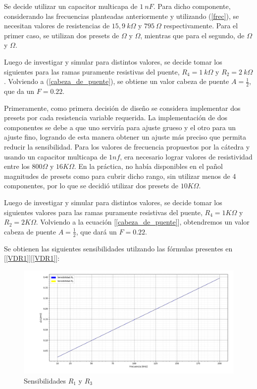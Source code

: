 Se decide utilizar un capacitor multicapa de $1 \ nF$. Para dicho componente, considerando las frecuencias planteadas anteriormente y utilizando (\ref{frec}), se necesitan valores de resistencias de $15,9 \ k\Omega$ y $795 \ \Omega$ respectivamente. Para el primer caso, se utilizan dos presets de $\Omega$ y $\Omega$, mientras que para el segundo, de $\Omega$ y $\Omega$.

Luego de investigar y simular para distintos valores, se decide tomar los siguientes para las ramas puramente resistivas del puente, $R_4= 1 \ k\Omega$ y $R_2= 2 \ k\Omega$. Volviendo a (\ref{cabeza_de_puente}), se obtiene un valor cabeza de puente $A=\frac{1}{2}$, que da un $F=0.22$.

Primeramente, como primera decisión de diseño se considera implementar dos presets por cada resistencia variable requerida. La implementación de dos componentes se debe a que uno serviría para ajuste grueso y el otro para un ajuste fino, logrando de esta manera obtener un ajuste más preciso que permita reducir la sensibilidad. Para los valores de frecuencia propuestos por la cátedra y usando un capacitor multicapa de $1nf$, era necesario lograr valores de resistividad entre los $800 \Omega$ y $16K\Omega$. En la práctica, no había disponibles en el pañol magnitudes de presets como para cubrir dicho rango, sin utilizar menos de 4 componentes, por lo que se decidió utilizar dos presets de $10K\Omega$.
\par 
Luego de investigar y simular para distintos valores, se decide tomar los siguientes valores para las ramas puramente resistivas del puente, $R_4=1K\Omega$ y $R_2=2K\Omega$. Volviendo a la ecuación [\ref{cabeza_de_puente}], obtendremos un valor cabeza de puente $A=\frac{1}{2}$, que dará un $F=0.22$.

Se obtienen las siguientes sensibilidades utilzando las fórmulas presentes en [\ref{VDR1}][\ref{VDR1}]:

\begin{figure}[H]
\centering
\includegraphics[scale=0.7]{Graficos/Sensibilidad}
\caption{Sensibilidades $R_1$ y $R_3$}
\label{fig:Sensibilidades}
\end{figure}



